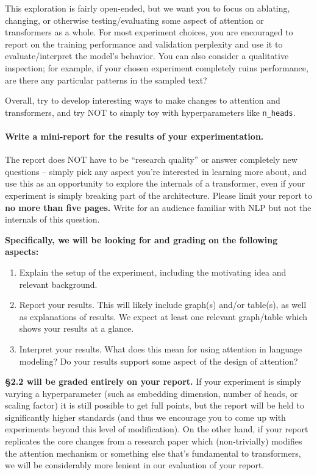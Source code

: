 \documentclass{article}
\begin{document}
    This exploration is fairly open-ended, but we want you to focus on ablating,
    changing, or otherwise testing/evaluating some aspect of attention or
    transformers as a whole. For most experiment choices, you are encouraged to
    report on the training performance and validation perplexity and use it to
    evaluate/interpret the model's behavior. You can also consider a qualitative
    inspection; for example, if your chosen experiment completely ruins
    performance, are there any particular patterns in the sampled text?

    Overall, try to develop interesting ways to make changes to attention and
    transformers, and try NOT to simply toy with hyperparameters like
    \verb|n_heads|. 

    \paragraph{Write a mini-report for the results of your experimentation.}
    
    The report does NOT have to be ``research quality'' or answer completely new
    questions -- simply pick any aspect you're interested in learning more
    about, and use this as an opportunity to explore the internals of a
    transformer, even if your experiment is simply breaking part of the
    architecture. Please limit your report to \textbf{no more than five pages.}
    Write for an audience familiar with NLP but not the internals of this
    question.
        
    \textbf{Specifically, we will be looking for and grading on the following aspects:}
    
    \begin{enumerate}
        \item Explain the setup of the experiment, including the motivating idea
        and relevant background.
        \item Report your results. This will likely include graph(s) and/or
        table(s), as well as explanations of results. We expect at least one
        relevant graph/table which shows your results at a glance.
        \item Interpret your results. What does this mean for using attention in
        language modeling? Do your results support some aspect of the design of
        attention?
    \end{enumerate}


    \textbf{\S 2.2 will be graded entirely on your report.}
    If your experiment is simply varying a hyperparameter (such as embedding
    dimension, number of heads, or scaling factor) it is still possible to get
    full points, but the report will be held to significantly higher standards
    (and thus we encourage you to come up with experiments beyond this level of
    modification). On the other hand, if your report replicates the core changes
    from a research paper which (non-trivially) modifies the attention mechanism
    or something else that's fundamental to transformers, we will be
    considerably more lenient in our evaluation of your report.
    
\end{document}
